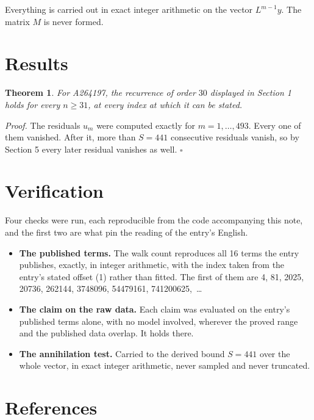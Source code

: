 \documentclass[11pt]{article}
\newtheorem{theorem}{Theorem}
\theoremstyle{definition}
\begin{document}
Everything is carried out in exact integer arithmetic on the vector $L^{m-1}y$. The matrix $M$ is never formed.

\section{Results}

\begin{theorem} For A264197, the recurrence of order $30$ displayed in Section 1 holds for every $n \ge 31$, at every index at which it can be stated.\end{theorem}

{\itshape Proof.} The residuals $u_m$ were computed exactly for $m = 1,\dots,493$. Every one of them vanished. After it, more than $S = 441$ consecutive residuals vanish, so by Section 5 every later residual vanishes as well. $\square$

\section{Verification}

Four checks were run, each reproducible from the code accompanying this note, and the first two are what pin the reading of the entry's English.

\begin{itemize}

\item {\bfseries The published terms.} The walk count reproduces all 16 terms the entry publishes, exactly, in integer arithmetic, with the index taken from the entry's stated offset (1) rather than fitted. The first of them are 4, 81, 2025, 20736, 262144, 3748096, 54479161, 741200625,~\dots

\item {\bfseries The claim on the raw data.} Each claim was evaluated on the entry's published terms alone, with no model involved, wherever the proved range and the published data overlap. It holds there.

\item {\bfseries The annihilation test.} Carried to the derived bound $S = 441$ over the whole vector, in exact integer arithmetic, never sampled and never truncated.

\end{itemize}

\section{References}
\end{document}
